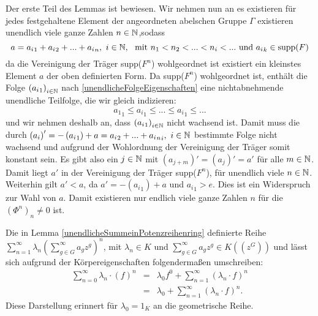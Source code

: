 {Der erste Teil des Lemmas ist bewiesen. Wir nehmen nun an es existieren für jedes festgehaltene Element der angeordneten abelschen Gruppe $\Gamma$ existieren unendlich viele ganze Zahlen $n \in \mathbb{N}$,sodass \[a = {a_i}_1 +{a_i}_2 + ... + {a_i}_n,~ i \in \mathbb{N},~\text{ mit } n_1 < n_2 < ... < n_i < ...\text{ und } {a_i}_k \in \text{supp}(F)\]
da die Vereinigung der Träger supp($F^n$) wohlgeordnet ist existiert ein kleinstes Element $a$ der oben definierten Form. Da supp($F^n$) wohlgeordnet ist, enthält die Folge $\left({a_i}_1\right)_{i\in \mathbb{N}}$ nach \ref{unendlicheFolgeEigenschaften} eine nichtabnehmende unendliche Teilfolge, die wir gleich indizieren:
\[{a_1}_1 \le {a_i}_1 \le ... \le {a_i}_1 \le ...\] und wir nehmen deshalb an, dass $\left({a_i}_1\right)_{i\in \mathbb{N}}$ nicht wachsend ist. Damit muss die durch $\left(a_i\right)' = -\left({a_i}_1\right) + a = {a_i}_2 + ... + {{a_i}_n}_i,~ i \in \mathbb{N}$ bestimmte Folge nicht wachsend und aufgrund der Wohlordnung der Vereinigung der Träger somit konstant sein. Es gibt also ein $j \in \mathbb{N}$ mit $\left(a_{j+m}\right)' = \left(a_j\right)' = a'$ für alle $m \in \mathbb{N}$. Damit liegt $a'$ in der Vereinigung der Träger supp($F^n$), für unendlich viele $n\in \mathbb{N}$. Weiterhin gilt $a' < a$, da $a' = -\left({a_i}_1\right) + a$ und ${a_i}_1 >e$. Dies ist ein Widerspruch zur Wahl von $a$. Damit existieren nur endlich viele ganze Zahlen $n$ für die $\left(\Phi^n\right)_n \neq 0$ ist.
}
%
%
%
%
%
%
%
%
%
%
%
%
%
%
%
%
%
%
%
%
%
%
%
%
\begin{bem}
Die in Lemma \ref{unendlicheSummeinPotenzreihenring} definierte Reihe $\sum_{n=1}^{\infty}\lambda_n{\left(\sum_{g \in G}^{\infty}a_g z^g\right)}^n$, mit $\lambda_n \in K$ und $\sum_{g \in G}^{\infty}a_g z^g \in K\left(\left(z^{G}\right)\right)$ und  lässt sich aufgrund der Körpereigenschaften folgendermaßen umschreiben:
\begin{eqnarray*}
\sum_{n=0}^{\infty}\lambda_n\cdot \left(f\right)^n &=& \lambda_0 f^0 + \sum_{n=1}^{\infty}\left(\lambda_n\cdot f\right)^n \\
&=& \lambda_0 + \sum_{n=1}^{\infty}\left(\lambda_n\cdot f\right)^n.
\end{eqnarray*}
%
%
%
Diese Darstellung erinnert für $\lambda_0 = 1_K$ an die geometrische Reihe. 
%
%
%
\end{bem}
%
%
%
%
%
%
%
 
